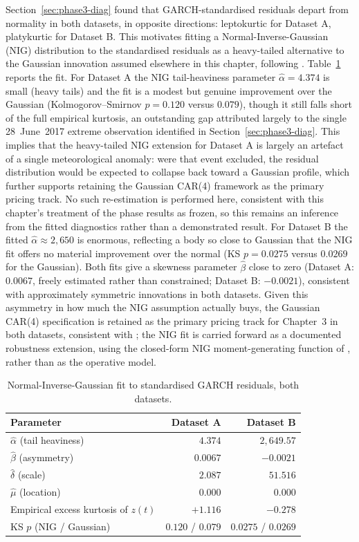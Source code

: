 Section~\ref{sec:phase3-diag} found that GARCH-standardised residuals depart from normality in both datasets, in opposite directions: leptokurtic for Dataset A, platykurtic for Dataset B. This motivates fitting a Normal-Inverse-Gaussian (NIG) distribution to the standardised residuals as a heavy-tailed alternative to the Gaussian innovation assumed elsewhere in this chapter, following \citet{BarndorffNielsenShephard2001}. Table~\ref{tab:nig} reports the fit. For Dataset A the NIG tail-heaviness parameter $\hat\alpha = 4.374$ is small (heavy tails) and the fit is a modest but genuine improvement over the Gaussian (Kolmogorov--Smirnov $p = 0.120$ versus $0.079$), though it still falls short of the full empirical kurtosis, an outstanding gap attributed largely to the single 28~June~2017 extreme observation identified in Section~\ref{sec:phase3-diag}. This implies that the heavy-tailed NIG extension for Dataset A is largely an artefact of a single meteorological anomaly: were that event excluded, the residual distribution would be expected to collapse back toward a Gaussian profile, which further supports retaining the Gaussian CAR(4) framework as the primary pricing track. No such re-estimation is performed here, consistent with this chapter's treatment of the phase results as frozen, so this remains an inference from the fitted diagnostics rather than a demonstrated result. For Dataset B the fitted $\hat\alpha \approx 2{,}650$ is enormous, reflecting a body so close to Gaussian that the NIG fit offers no material improvement over the normal (KS $p = 0.0275$ versus $0.0269$ for the Gaussian). Both fits give a skewness parameter $\hat\beta$ close to zero (Dataset A: $0.0067$, freely estimated rather than constrained; Dataset B: $-0.0021$), consistent with approximately symmetric innovations in both datasets. Given this asymmetry in how much the NIG assumption actually buys, the Gaussian CAR(4) specification is retained as the primary pricing track for Chapter~3 in both datasets, consistent with \citet{BenthSaltyteBenth2009}; the NIG fit is carried forward as a documented robustness extension, using the closed-form NIG moment-generating function of \citet{BrockwellMarquardt2005}, rather than as the operative model.

\begin{table}[htbp]
\centering
\caption{Normal-Inverse-Gaussian fit to standardised GARCH residuals, both datasets.}
\label{tab:nig}
\begin{tabular}{l r r}
\toprule
\textbf{Parameter} & \textbf{Dataset A} & \textbf{Dataset B} \\
\midrule
$\hat\alpha$ (tail heaviness) & $4.374$ & $2{,}649.57$ \\
$\hat\beta$ (asymmetry) & $0.0067$ & $-0.0021$ \\
$\hat\delta$ (scale) & $2.087$ & $51.516$ \\
$\hat\mu$ (location) & $0.000$ & $0.000$ \\
Empirical excess kurtosis of $z(t)$ & $+1.116$ & $-0.278$ \\
KS $p$ (NIG / Gaussian) & $0.120$ / $0.079$ & $0.0275$ / $0.0269$ \\
\bottomrule
\end{tabular}
\end{table}

